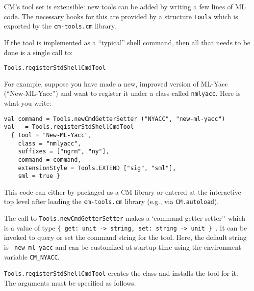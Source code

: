 \documentclass{article}
\begin{document}
CM's tool set is extensible: new tools can be added by writing a few
lines of ML code.  The necessary hooks for this are provided by a
structure {\tt Tools} which is exported by the {\tt cm-tools.cm}
library.

If the tool is implemented as a ``typical'' shell command, then all
that needs to be done is a single call to:

\begin{verbatim}
Tools.registerStdShellCmdTool
\end{verbatim}

For example, suppose you have made a
new, improved version of ML-Yacc (``New-ML-Yacc'') and want to
register it under a class called {\tt nmlyacc}.  Here is what you
write:

\begin{verbatim}
val command = Tools.newCmdGetterSetter ("NYACC", "new-ml-yacc")
val _ = Tools.registerStdShellCmdTool
  { tool = "New-ML-Yacc",
    class = "nmlyacc",
    suffixes = ["ngrm", "ny"],
    command = command,
    extensionStyle = Tools.EXTEND ["sig", "sml"],
    sml = true }
\end{verbatim}

This code can either by packaged as a CM library or entered at the
interactive top level after loading the {\tt cm-tools.cm} library
(e.g., via {\tt CM.autoload}).

The call to {\tt Tools.newCmdGetterSetter} makes a `command
getter-setter'' which is a value of type {\tt \{ get: unit -> string,
set: string -> unit \} }. It can be invoked to query or set the
command string for the tool.  Here, the default string is {\tt
new-ml-yacc} and can be customized at startup time using the
environment variable {\tt CM\_NYACC}.

{\tt Tools.registerStdShellCmdTool} creates the class and installs the
tool for it.  The arguments must be specified as follows:
\end{document}
